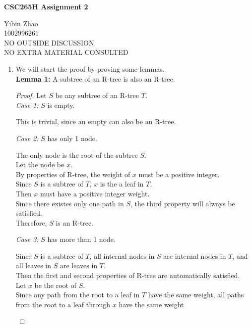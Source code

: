 \documentclass[10pt]{article}
\begin{document}
\begin{center}
{\bf \Large \bf CSC265H Assignment 2}\\
\end{center}

\noindent
Yibin Zhao\\
1002996261\\
NO OUTSIDE DISCUSSION\\
NO EXTRA MATERIAL CONSULTED\\

\begin{enumerate}

	\item We will start the proof by proving some lemmas.\\ 
	\textbf{Lemma 1:} A subtree of an R-tree is also an R-tree.
	\begin{proof}
		Let $S$ be any subtree of an R-tree $T$. \\
		\textit{Case 1:} $S$ is empty.
		\begin{addmargin}[1em]{0em}
			This is trivial, since an empty can also be an R-tree.
		\end{addmargin}
		\textit{Case 2:} $S$ has only 1 node.
		\begin{addmargin}[1em]{0em}
			The only node is the root of the subtree $S$. \\
			Let the node be $x$. \\
			By properties of R-tree, the weight of $x$ must be a positive
			integer. \\
			Since $S$ is a subtree of $T$, $x$ is the a leaf in $T$. \\
			Then $x$ must have a positive integer weight. \\
			Since there existes only one path in $S$, the third property will
			always be satisfied. \\
			Therefore, $S$ is an R-tree.
		\end{addmargin}
		\textit{Case 3:} $S$ has more than 1 node. \\
		\begin{addmargin}[1em]{0em}
			Since $S$ is a subtree of $T$, all internal nodes in $S$ are
			internal nodes in $T$, and all leaves in $S$ are leaves in $T$. \\
			Then the first and second properties of R-tree are automatically
			satisfied. \\
			Let $x$ be the root of $S$. \\
			Since any path from the root to a leaf in $T$ have the same weight,
			all paths from the root to a leaf through $x$ have the same weight

\end{addmargin}
\end{proof}
\end{enumerate}
\end{document}
